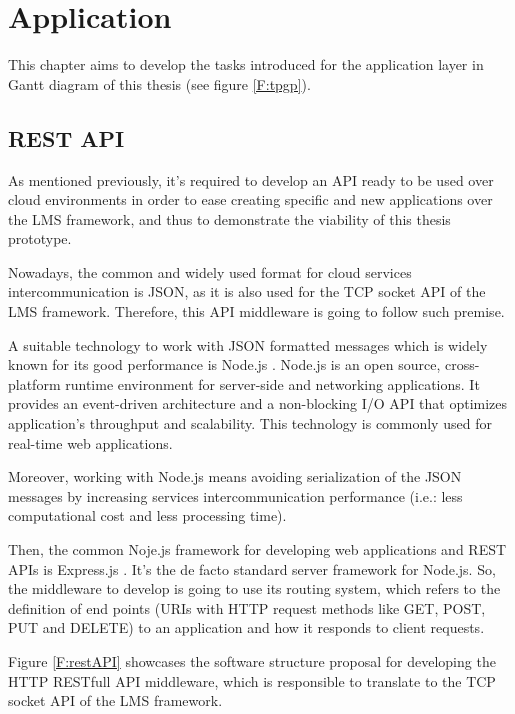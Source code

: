 \chapter{Application}\label{D:application}

This chapter aims to develop the tasks introduced for the application layer in Gantt diagram of this thesis (see figure \ref{F:tpgp}).

\section{REST API}

As mentioned previously, it's required to develop an API ready to be used over cloud environments in order to ease creating specific and new applications over the LMS framework, and thus to demonstrate the viability of this thesis prototype.

Nowadays, the common and widely used format for cloud services intercommunication is JSON, as it is also used for the TCP socket API of the LMS framework. Therefore, this API middleware is going to follow such premise.

A suitable technology to work with JSON formatted messages which is widely known for its good performance is Node.js \cite{nodejs}. Node.js is an open source, cross-platform runtime environment for server-side and networking applications. It provides an event-driven architecture and a non-blocking I/O API that optimizes application's throughput and scalability. This technology is commonly used for real-time web applications. 

Moreover, working with Node.js means avoiding serialization of the JSON messages by increasing services intercommunication performance (i.e.: less computational cost and less processing time). 

Then, the common Noje.js framework for developing web applications and REST APIs is Express.js \cite{expressjs}. It's the de facto standard server framework for Node.js. So, the middleware to develop is going to use its routing system, which refers to the definition of end points (URIs with HTTP request methods like GET, POST, PUT and DELETE) to an application and how it responds to client requests.

Figure \ref{F:restAPI} showcases the software structure proposal for developing the HTTP RESTfull API middleware, which is responsible to translate to the TCP socket API of the LMS framework.

